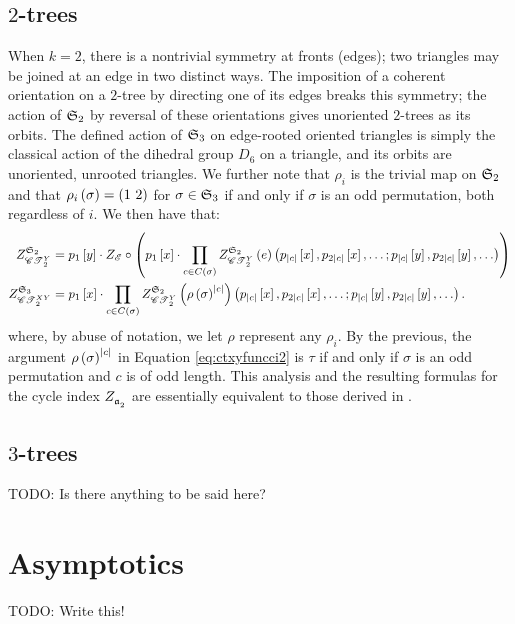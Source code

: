 \documentclass[distribution,draft]{brandiss} %
\numberwithin{section}{chapter}
\numberwithin{figure}{chapter}
\begin{document}
\subsection{$2$-trees}
When $k=2$, there is a nontrivial symmetry at fronts (edges); two triangles may be joined at an edge in two distinct ways.
The imposition of a coherent orientation on a $2$-tree by directing one of its edges breaks this symmetry; the action of $\symgp{2}$ by reversal of these orientations gives unoriented $2$-trees as its orbits.
The defined action of $\symgp{3}$ on edge-rooted oriented triangles is simply the classical action of the dihedral group $D_{6}$ on a triangle, and its orbits are unoriented, unrooted triangles.
We further note that $\rho_{i}$ is the trivial map on $\symgp{2}$ and that $\rho_{i} \pbrac{\sigma} = \pbrac{1\ 2}$ for $\sigma \in \symgp{3}$ if and only if $\sigma$ is an odd permutation, both regardless of $i$.
We then have that:
\begin{subequations}
  \label{eq:rest2trees}
  \begin{align}
    \gci{\symgp{2}}{\cty{2}} &= p_{1} \sbrac{y} \cdot Z_{\specname{E}} \circ \pbrac{p_{1} \sbrac{x} \cdot \prod_{c \in C \pbrac{\sigma}} \gcieltvars{\symgp{2}}{\cty{2}}{e}{p_{\abs{c}} \sbrac{x}, p_{2 \abs{c}} \sbrac{x}, \dots; p_{\abs{c}} \sbrac{y}, p_{2 \abs{c}} \sbrac{y}, \dots}} \label{eq:ctyfuncci2} \\
    \gci{\symgp{3}}{\ctxy{2}} &= p_{1} \sbrac{x} \cdot \prod_{c \in C \pbrac{\sigma}} \gcieltvars{\symgp{2}}{\cty{2}}{\rho \pbrac{\sigma}^{\abs{c}}}{p_{\abs{c}} \sbrac{x}, p_{2 \abs{c}} \sbrac{x}, \dots; p_{\abs{c}} \sbrac{y}, p_{2 \abs{c}} \sbrac{y}, \dots}. \label{eq:ctxyfuncci2}
  \end{align}
\end{subequations}
where, by abuse of notation, we let $\rho$ represent any $\rho_{i}$.
By the previous, the argument $\rho \pbrac{\sigma}^{\abs{c}}$ in Equation \eqref{eq:ctxyfuncci2} is $\tau$ if and only if $\sigma$ is an odd permutation and $c$ is of odd length.
This analysis and the resulting formulas for the cycle index $\ci{\kt{2}}$ are essentially equivalent to those derived in \cite{gessel:spec2trees}.

\subsection{$3$-trees}
TODO: Is there anything to be said here?

\section{Asymptotics}
TODO: Write this!
\end{document}
